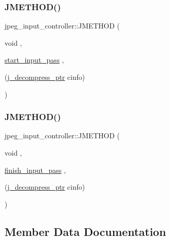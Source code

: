 \mbox{\label{structjpeg__input__controller_aef985c09924396a078c67592da47d679}} 
\subsubsection{\texorpdfstring{JMETHOD()}{JMETHOD()}\hspace{0.1cm}{\footnotesize\ttfamily [3/4]}}
{\footnotesize\ttfamily jpeg\+\_\+input\+\_\+controller\+::\+J\+M\+E\+T\+H\+OD (\begin{DoxyParamCaption}\item[{void}]{,  }\item[{\mbox{\hyperlink{jdinput_8c_abc0a94e24edf93bc7f914cf4a698a870}{start\+\_\+input\+\_\+pass}}}]{,  }\item[{(\mbox{\hyperlink{jpeglib_8h_a00c7d78af44bd26a901c791ccfc1e178}{j\+\_\+decompress\+\_\+ptr}} cinfo)}]{ }\end{DoxyParamCaption})}

\mbox{\label{structjpeg__input__controller_a70620c8e0ea8fd2f7b0243cd9bf395e1}} 
\subsubsection{\texorpdfstring{JMETHOD()}{JMETHOD()}\hspace{0.1cm}{\footnotesize\ttfamily [4/4]}}
{\footnotesize\ttfamily jpeg\+\_\+input\+\_\+controller\+::\+J\+M\+E\+T\+H\+OD (\begin{DoxyParamCaption}\item[{void}]{,  }\item[{\mbox{\hyperlink{jdinput_8c_a9777f7fabb58d9a42f34510bf0a71d1c}{finish\+\_\+input\+\_\+pass}}}]{,  }\item[{(\mbox{\hyperlink{jpeglib_8h_a00c7d78af44bd26a901c791ccfc1e178}{j\+\_\+decompress\+\_\+ptr}} cinfo)}]{ }\end{DoxyParamCaption})}



\subsection{Member Data Documentation}
\mbox{\label{structjpeg__input__controller_a8e1c345f356d36f98c2ece4dc21549d7}} 
